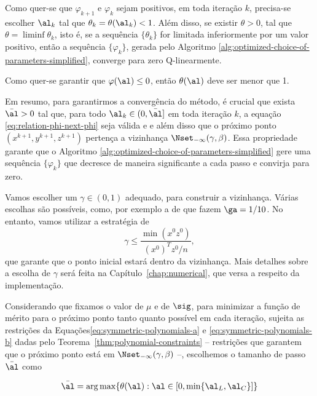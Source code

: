 Como quer-se que $\varphi_{k+1} $  e $\varphi_{k} $ sejam positivos, em toda iteração $k$, precisa-se escolher $\al_k$ tal que  $\theta_k = \theta(\al_k)<1$. Além disso, se existir $\theta>0$, tal que $\theta = \liminf \theta_k$, isto é, se a sequência $\{\theta_k\}$ for limitada inferiormente por um valor positivo, então a sequência $\{\varphi_k\}$, gerada pelo Algoritmo \ref{alg:optimized-choice-of-parameters-simplified}, converge para zero Q-linearmente.


Como quer-se garantir que $\varphi(\al) \leq  0$, então $\theta(\al)$ deve ser menor que 1. 


 Em resumo, para garantirmos a convergência do método, é crucial que exista $\bar{\al}>0$  tal que,  para todo $\al_k\in(0,\bar{\al}]$ em toda iteração $k$, a equação \eqref{eq:relation-phi-next-phi} seja válida e  e além disso que o próximo ponto  $({x}^{k+1} ,{y}^{k+1},{z}^{k+1})$ pertença a vizinhança $\Nset_{-\infty}(\gamma,\beta)$.
 Essa propriedade garante que  o Algoritmo \ref{alg:optimized-choice-of-parameters-simplified} gere uma sequência $\{\varphi_k\}$ que decresce de maneira significante a cada passo e convirja para zero.



Vamos escolher um $\gamma\in(0,1)$ adequado, para construir a vizinhança. Várias escolhas são possíveis, como, por exemplo a de \textcite{Colombo:2008ia} que fazem $\ga = 1/10$. No entanto, vamos utilizar a estratégia de \textcite{Zhang:2006ic}
\[
\gamma \leq \frac{\min(x^0z^0)}{(x^0)^Tz^0/n},
\]
que garante que o ponto inicial estará dentro da vizinhança. Mais detalhes sobre a escolha de $\gamma$ será feita na Capítulo~\ref{chap:numerical}, que versa a respeito da implementação.

Considerando que fixamos o valor de $\mu$ e de $\sig$, para minimizar a função de mérito para o próximo ponto tanto quanto possível em cada iteração, sujeita as restrições da Equações\eqref{eq:symmetric-polynomials-a} e \eqref{eq:symmetric-polynomials-b} dadas pelo Teorema~\ref{thm:polynomial-constraints} -- restrições que garantem que o próximo ponto está em $\Nset_{-\infty}(\gamma,\beta)$ --, escolhemos o tamanho de passo $\bar{\al}$ como

\begin{equation}
\label{eq:bound-alpha}
	\bar{\al} = \arg\max \{\theta(\al):\al\in[0,\min\{\al_L,\al_C\}] \}
\end{equation}





